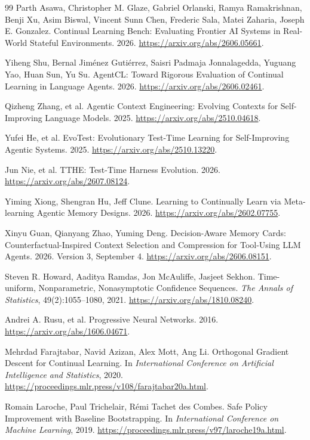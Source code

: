 \begin{thebibliography}{99}
Parth Asawa, Christopher M. Glaze, Gabriel Orlanski, Ramya Ramakrishnan, Benji Xu, Asim Biswal, Vincent Sunn Chen, Frederic Sala, Matei Zaharia, Joseph E. Gonzalez.
Continual Learning Bench: Evaluating Frontier AI Systems in Real-World Stateful Environments.
2026.
\url{https://arxiv.org/abs/2606.05661}.

Yiheng Shu, Bernal Jim{\'e}nez Guti{\'e}rrez, Saisri Padmaja Jonnalagedda, Yuguang Yao, Huan Sun, Yu Su.
{AgentCL}: Toward Rigorous Evaluation of Continual Learning in Language Agents.
2026.
\url{https://arxiv.org/abs/2606.02461}.

Qizheng Zhang, et al.
Agentic Context Engineering: Evolving Contexts for Self-Improving Language Models.
2025.
\url{https://arxiv.org/abs/2510.04618}.

Yufei He, et al.
{EvoTest}: Evolutionary Test-Time Learning for Self-Improving Agentic Systems.
2025.
\url{https://arxiv.org/abs/2510.13220}.

Jun Nie, et al.
{TTHE}: Test-Time Harness Evolution.
2026.
\url{https://arxiv.org/abs/2607.08124}.

Yiming Xiong, Shengran Hu, Jeff Clune.
Learning to Continually Learn via Meta-learning Agentic Memory Designs.
2026.
\url{https://arxiv.org/abs/2602.07755}.

Xinyu Guan, Qianyang Zhao, Yuming Deng.
Decision-Aware Memory Cards: Counterfactual-Inspired Context Selection and Compression for Tool-Using {LLM} Agents.
2026.
Version 3, September 4.
\url{https://arxiv.org/abs/2606.08151}.

Steven R. Howard, Aaditya Ramdas, Jon McAuliffe, Jasjeet Sekhon.
Time-uniform, Nonparametric, Nonasymptotic Confidence Sequences.
\emph{The Annals of Statistics}, 49(2):1055--1080, 2021.
\url{https://arxiv.org/abs/1810.08240}.

Andrei A. Rusu, et al.
Progressive Neural Networks.
2016.
\url{https://arxiv.org/abs/1606.04671}.

Mehrdad Farajtabar, Navid Azizan, Alex Mott, Ang Li.
Orthogonal Gradient Descent for Continual Learning.
In \emph{International Conference on Artificial Intelligence and Statistics}, 2020.
\url{https://proceedings.mlr.press/v108/farajtabar20a.html}.

Romain Laroche, Paul Trichelair, R{\'e}mi Tachet des Combes.
Safe Policy Improvement with Baseline Bootstrapping.
In \emph{International Conference on Machine Learning}, 2019.
\url{https://proceedings.mlr.press/v97/laroche19a.html}.


\end{thebibliography}
